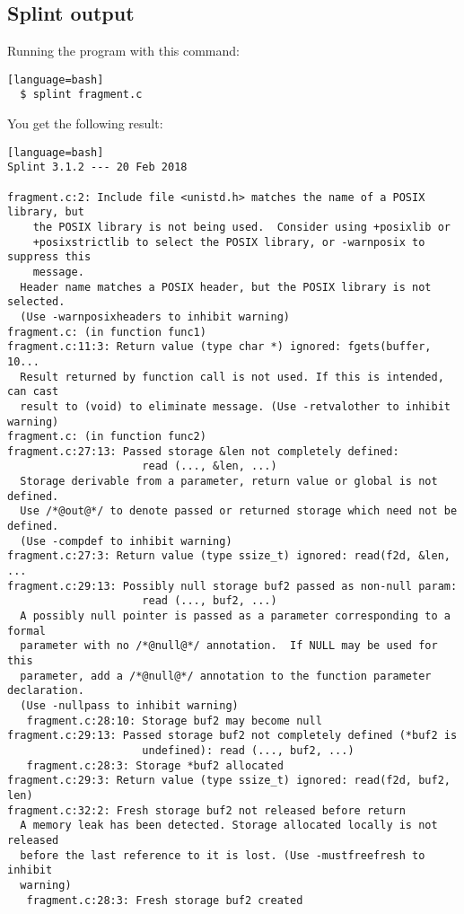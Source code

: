 \documentclass[a4paper,12pt]{article}
\begin{document}
\subsection{Splint output}

Running the program with this command:\begin{lstlisting}[style=DOS][language=bash]
  $ splint fragment.c
\end{lstlisting}

You get the following result:
\begin{lstlisting}[style=DOS][language=bash]
Splint 3.1.2 --- 20 Feb 2018

fragment.c:2: Include file <unistd.h> matches the name of a POSIX library, but
    the POSIX library is not being used.  Consider using +posixlib or
    +posixstrictlib to select the POSIX library, or -warnposix to suppress this
    message.
  Header name matches a POSIX header, but the POSIX library is not selected.
  (Use -warnposixheaders to inhibit warning)
fragment.c: (in function func1)
fragment.c:11:3: Return value (type char *) ignored: fgets(buffer, 10...
  Result returned by function call is not used. If this is intended, can cast
  result to (void) to eliminate message. (Use -retvalother to inhibit warning)
fragment.c: (in function func2)
fragment.c:27:13: Passed storage &len not completely defined:
                     read (..., &len, ...)
  Storage derivable from a parameter, return value or global is not defined.
  Use /*@out@*/ to denote passed or returned storage which need not be defined.
  (Use -compdef to inhibit warning)
fragment.c:27:3: Return value (type ssize_t) ignored: read(f2d, &len, ...
fragment.c:29:13: Possibly null storage buf2 passed as non-null param:
                     read (..., buf2, ...)
  A possibly null pointer is passed as a parameter corresponding to a formal
  parameter with no /*@null@*/ annotation.  If NULL may be used for this
  parameter, add a /*@null@*/ annotation to the function parameter declaration.
  (Use -nullpass to inhibit warning)
   fragment.c:28:10: Storage buf2 may become null
fragment.c:29:13: Passed storage buf2 not completely defined (*buf2 is
                     undefined): read (..., buf2, ...)
   fragment.c:28:3: Storage *buf2 allocated
fragment.c:29:3: Return value (type ssize_t) ignored: read(f2d, buf2, len)
fragment.c:32:2: Fresh storage buf2 not released before return
  A memory leak has been detected. Storage allocated locally is not released
  before the last reference to it is lost. (Use -mustfreefresh to inhibit
  warning)
   fragment.c:28:3: Fresh storage buf2 created

\end{lstlisting}
\end{document}

